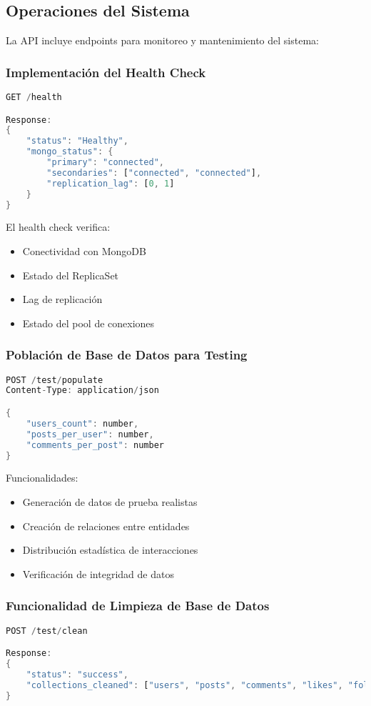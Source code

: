 \documentclass[12pt,letterpaper]{article}
\begin{document}
\subsection{Operaciones del Sistema}
La API incluye endpoints para monitoreo y mantenimiento del sistema:

\subsubsection{Implementación del Health Check}
\begin{lstlisting}[language=rust]
GET /health

Response:
{
    "status": "Healthy",
    "mongo_status": {
        "primary": "connected",
        "secondaries": ["connected", "connected"],
        "replication_lag": [0, 1]
    }
}
\end{lstlisting}

El health check verifica:
\begin{itemize}
    \item Conectividad con MongoDB
    \item Estado del ReplicaSet
    \item Lag de replicación
    \item Estado del pool de conexiones
\end{itemize}

\subsubsection{Población de Base de Datos para Testing}
\begin{lstlisting}[language=rust]
POST /test/populate
Content-Type: application/json

{
    "users_count": number,
    "posts_per_user": number,
    "comments_per_post": number
}
\end{lstlisting}

Funcionalidades:
\begin{itemize}
    \item Generación de datos de prueba realistas
    \item Creación de relaciones entre entidades
    \item Distribución estadística de interacciones
    \item Verificación de integridad de datos
\end{itemize}

\subsubsection{Funcionalidad de Limpieza de Base de Datos}
\begin{lstlisting}[language=rust]
POST /test/clean

Response:
{
    "status": "success",
    "collections_cleaned": ["users", "posts", "comments", "likes", "follows"]
}
\end{lstlisting}
\end{document}
